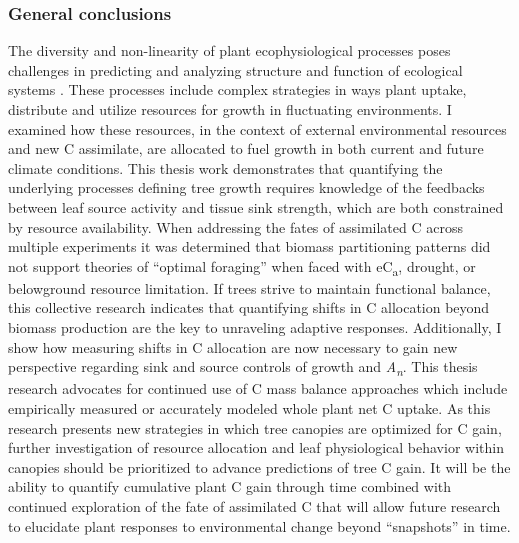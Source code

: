 \documentclass[a4paper]{article}\usepackage[]{graphicx}\usepackage[]{color}
\begin{document}
\subsubsection*{General conclusions}
The diversity and non-linearity of plant ecophysiological processes poses challenges in predicting and analyzing structure and function of ecological systems \citep{field1983allocating}. These processes include complex strategies in ways plant uptake, distribute and utilize resources for growth in fluctuating environments. I examined how these resources, in the context of external environmental resources and new C assimilate, are allocated to fuel growth in both current and future climate conditions. This thesis work demonstrates that quantifying the underlying processes defining tree growth requires knowledge of the feedbacks between leaf source activity and tissue sink strength, which are both constrained by resource availability.  When addressing the fates of assimilated C across multiple experiments it was determined that biomass partitioning patterns did not support theories of \enquote{optimal foraging} when faced with eC\textsubscript{a}, drought, or belowground resource limitation. If trees strive to maintain functional balance, this collective research indicates that quantifying shifts in C allocation beyond biomass production are the key to unraveling adaptive responses. Additionally, I show how measuring shifts in C allocation are now necessary to gain new perspective regarding sink and source controls of growth and \textit{A\textsubscript{n}}. This thesis research advocates for continued use of C mass balance approaches which include empirically measured or accurately modeled whole plant net C uptake. As this research presents new strategies in which tree canopies are optimized for C gain, further investigation of resource allocation and leaf physiological behavior within canopies should be prioritized to advance predictions of tree C gain. It will be the ability to quantify cumulative plant C gain through time combined with continued exploration of the fate of assimilated C that will allow future research to elucidate plant responses to environmental change beyond \enquote{snapshots} in time.
\end{document}
